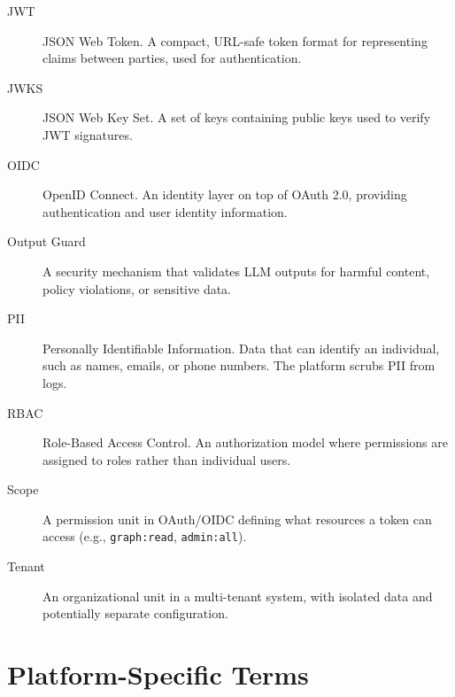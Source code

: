\documentclass[a4paper,twoside]{sapthesis}
\begin{document}
\begin{description}

\item[JWT]
JSON Web Token. A compact, URL-safe token format for representing claims between parties, used for authentication.

\item[JWKS]
JSON Web Key Set. A set of keys containing public keys used to verify JWT signatures.

\item[OIDC]
OpenID Connect. An identity layer on top of OAuth 2.0, providing authentication and user identity information.

\item[Output Guard]
A security mechanism that validates LLM outputs for harmful content, policy violations, or sensitive data.

\item[PII]
Personally Identifiable Information. Data that can identify an individual, such as names, emails, or phone numbers. The platform scrubs PII from logs.

\item[RBAC]
Role-Based Access Control. An authorization model where permissions are assigned to roles rather than individual users.

\item[Scope]
A permission unit in OAuth/OIDC defining what resources a token can access (e.g., \texttt{graph:read}, \texttt{admin:all}).

\item[Tenant]
An organizational unit in a multi-tenant system, with isolated data and potentially separate configuration.

\end{description}

\section{Platform-Specific Terms}
\label{app:glossary:platform}
\end{document}

